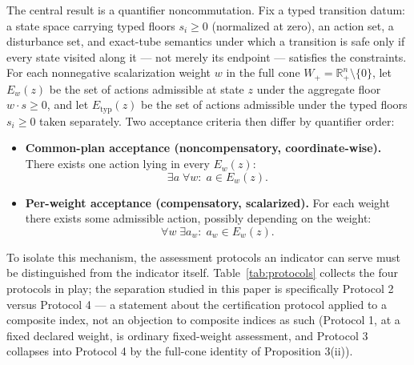\documentclass[3p,11pt]{elsarticle}
\providecommand{\tightlist}{\setlength{\itemsep}{0pt}\setlength{\parskip}{0pt}}
\begin{document}
The central result is a quantifier noncommutation. Fix a
typed transition datum: a state space carrying typed floors
\(s_i \ge 0\) (normalized at zero), an action set, a disturbance set,
and exact-tube semantics under which a transition is safe only if every
state visited along it --- not merely its endpoint --- satisfies the
constraints. For each nonnegative scalarization weight \(w\) in the full
cone \(W_+ = \mathbb{R}^n_+ \setminus \{0\}\), let \(E_w(z)\) be the set
of actions admissible at state \(z\) under the aggregate floor
\(w \cdot s \ge 0\), and let \(E_{\mathrm{typ}}(z)\) be the set of
actions admissible under the typed floors \(s_i \ge 0\) taken
separately. Two acceptance criteria then differ by quantifier order:

\begin{itemize}
\tightlist
\item
  \textbf{Common-plan acceptance (noncompensatory, coordinate-wise).} There exists one
  action lying in every \(E_w(z)\):
  \[\exists a\; \forall w:\; a \in E_w(z).\]
\item
  \textbf{Per-weight acceptance (compensatory, scalarized).} For each weight there
  exists some admissible action, possibly depending on the weight:
  \[\forall w\; \exists a_w:\; a_w \in E_w(z).\]
\end{itemize}
To isolate this mechanism, the assessment protocols an indicator can serve
must be distinguished from the indicator itself.
Table~\ref{tab:protocols} collects the four protocols in play; the
separation studied in this paper is specifically Protocol 2 versus
Protocol 4 --- a statement about the certification protocol applied to a
composite index, not an objection to composite indices as such (Protocol
1, at a fixed declared weight, is ordinary fixed-weight assessment, and
Protocol 3 collapses into Protocol 4 by the full-cone identity of
Proposition 3(ii)).
\end{document}
